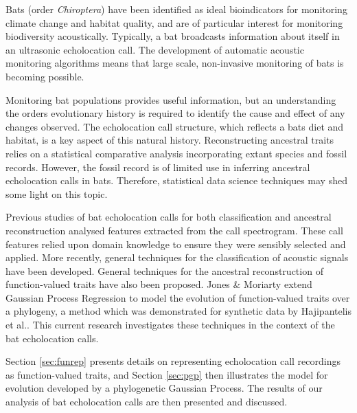 \documentclass{ws-rv9x6}
\begin{document}
Bats (order \textit{Chiroptera}) have been identified as ideal bioindicators for monitoring climate change and habitat quality,\cite{jones2009carpe} and are of particular interest for monitoring biodiversity acoustically. Typically, a bat broadcasts information about itself in an ultrasonic echolocation call.\cite{griffin1944echolocation} The development of automatic acoustic monitoring algorithms \cite{stathopoulos2017bat} \cite{walters2012continental} means that large scale, non-invasive monitoring of bats is becoming possible.   

Monitoring bat populations provides useful information, but an understanding the orders evolutionary history is required to identify the cause and effect of any changes observed. The echolocation call structure, which reflects a bats diet and habitat,\cite{aldridge1987morphology}  is a key aspect of this natural history. Reconstructing ancestral traits\cite{joy2016ancestral} relies on a statistical comparative analysis incorporating extant species and fossil records. \cite{felsenstein2004inferring} However, the fossil record is of limited use in inferring ancestral echolocation calls in bats. Therefore, statistical data science techniques may shed some light on this topic.

Previous studies of bat echolocation calls for both classification \cite{walters2012continental} and ancestral reconstruction \cite{collen2012evolution} analysed features extracted from the call spectrogram. These call features relied upon domain knowledge to ensure they were sensibly selected and applied. More recently, general techniques for the classification of acoustic signals have been developed. \cite{stathopoulos2014bat} \cite{damoulas2010bayesian} General techniques for the ancestral reconstruction of function-valued traits have also been proposed. \cite{group2012phylogenetic} Jones \& Moriarty \cite{jones2013evolutionary} extend Gaussian Process Regression \cite{rasmussen2006gaussian} to model the evolution of function-valued traits\cite{meyer2005up} over a phylogeny, a method which was demonstrated for synthetic data by Hajipantelis et al.\cite{hadjipantelis2013function}. This current research investigates these techniques in the context of the bat echolocation calls.

Section \ref{sec:funrep} presents details on representing echolocation call recordings as function-valued traits, and Section \ref{sec:pgp} then illustrates the model for evolution developed by a phylogenetic Gaussian Process. The results of our analysis of bat echolocation calls are then presented and discussed. 
\end{document}
